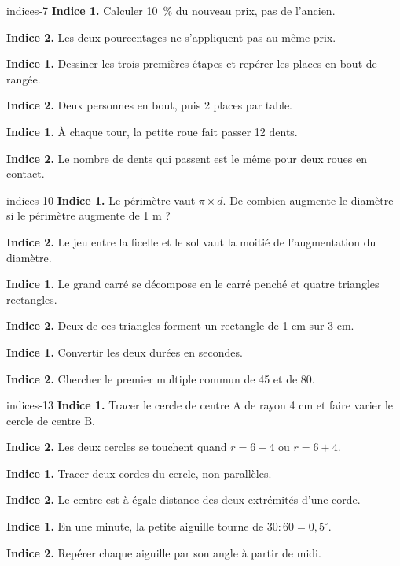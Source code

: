 \begin{blocEdition}{indices-7}
\textbf{Indice 1.} Calculer 10~\% du nouveau prix, pas de l’ancien.\par\medskip\textbf{Indice 2.} Les deux pourcentages ne s’appliquent pas au même prix.\par
{}\textbf{Indice 1.} Dessiner les trois premières étapes et repérer les places en bout de rangée.\par\medskip\textbf{Indice 2.} Deux personnes en bout, puis 2 places par table.\par
{}\textbf{Indice 1.} À chaque tour, la petite roue fait passer 12 dents.\par\medskip\textbf{Indice 2.} Le nombre de dents qui passent est le même pour deux roues en contact.\par

\end{blocEdition}
\begin{blocEdition}{indices-10}
\textbf{Indice 1.} Le périmètre vaut $\pi\times d$. De combien augmente le diamètre si le périmètre augmente de 1 m ?\par\medskip\textbf{Indice 2.} Le jeu entre la ficelle et le sol vaut la moitié de l’augmentation du diamètre.\par
{}\textbf{Indice 1.} Le grand carré se décompose en le carré penché et quatre triangles rectangles.\par\medskip\textbf{Indice 2.} Deux de ces triangles forment un rectangle de 1 cm sur 3 cm.\par
{}\textbf{Indice 1.} Convertir les deux durées en secondes.\par\medskip\textbf{Indice 2.} Chercher le premier multiple commun de 45 et de 80.\par

\end{blocEdition}
\begin{blocEdition}{indices-13}
\textbf{Indice 1.} Tracer le cercle de centre A de rayon 4 cm et faire varier le cercle de centre B.\par\medskip\textbf{Indice 2.} Les deux cercles se touchent quand $r=6-4$ ou $r=6+4$.\par
{}\textbf{Indice 1.} Tracer deux cordes du cercle, non parallèles.\par\medskip\textbf{Indice 2.} Le centre est à égale distance des deux extrémités d’une corde.\par
{}\textbf{Indice 1.} En une minute, la petite aiguille tourne de $30:60=0{,}5^\circ$.\par\medskip\textbf{Indice 2.} Repérer chaque aiguille par son angle à partir de midi.\par

\end{blocEdition}
